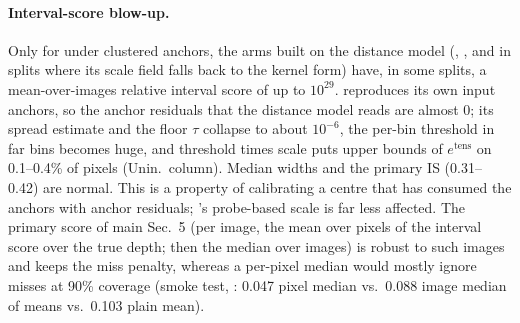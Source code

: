 \documentclass[10pt,twocolumn,letterpaper]{article}
\begin{document}
\paragraph{Interval-score blow-up.} Only for \omnidc under clustered anchors, the arms built on the distance model (\mDistSplit, \mDualBoth, and \mDual in splits where its scale field falls back to the kernel form) have, in some splits, a mean-over-images relative interval score of up to $10^{29}$. \omnidc reproduces its own input anchors, so the anchor residuals that the distance model reads are almost $0$; its spread estimate and the floor $\tau$ collapse to about $10^{-6}$, the per-bin threshold in far bins becomes huge, and threshold times scale puts upper bounds of $e^{\text{tens}}$ on 0.1--0.4\% of pixels (Unin.\ column). Median widths and the primary IS (0.31--0.42) are normal. This is a property of calibrating a centre that has consumed the anchors with anchor residuals; \mDual's probe-based scale is far less affected.
The primary score of main Sec.~5 (per image, the mean over pixels of the interval score over the true depth; then the median over images) is robust to such images and keeps the miss penalty, whereas a per-pixel median would mostly ignore misses at 90\% coverage (smoke test, \mDual: 0.047 pixel median vs.\ 0.088 image median of means vs.\ 0.103 plain mean).
\end{document}
